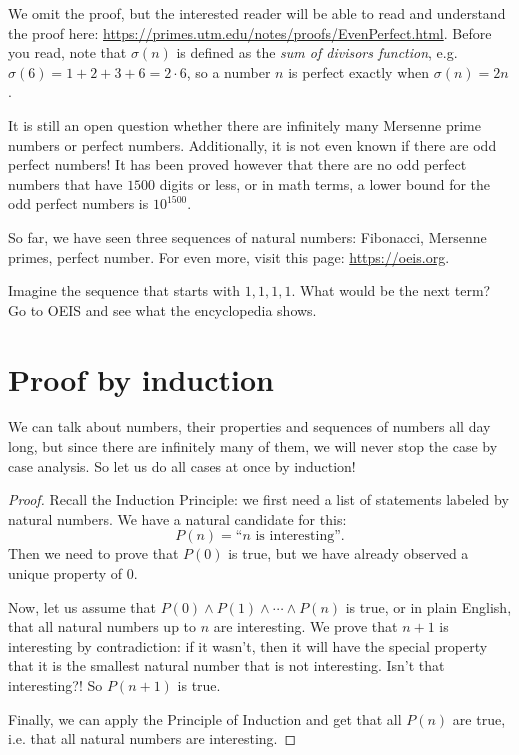 We omit the proof, but the interested reader will be able to read and understand the proof here: \url{https://primes.utm.edu/notes/proofs/EvenPerfect.html}. Before you read, note that $\sigma(n)$ is defined as the \emph{sum of divisors function}, e.g. $\sigma(6) = 1 + 2 + 3 + 6 = 2\cdot 6$, so a number $n$ is perfect exactly when $\sigma(n) = 2n$.

It is still an open question whether there are infinitely many Mersenne prime numbers or perfect numbers. Additionally, it is not even known if there are odd perfect numbers! It has been proved however that there are no odd perfect numbers that have $1500$ digits or less, or in math terms, a lower bound for the odd perfect numbers is $10^{1500}$.

So far, we have seen three sequences of natural numbers: Fibonacci, Mersenne primes, perfect number. For even more, visit this page: \url{https://oeis.org}.

\begin{exercise}
    Imagine the sequence that starts with $1,1,1,1$. What would be the next term? Go to OEIS and see what the encyclopedia shows.
\end{exercise}


\section{Proof by induction}

We can talk about numbers, their properties and sequences of numbers all day long, but since there are infinitely many of them, we will never stop the case by case analysis. So let us do all cases at once by induction!

\begin{proof}
Recall the Induction Principle: we first need a list of statements labeled by natural numbers. We have a natural candidate for this:
$$ P(n) = \mbox{``$n$ is interesting''}
.$$
Then we need to prove that $P(0)$ is true, but we have already observed a unique property of $0$. 

Now, let us assume that $P(0) \wedge P(1) \wedge \cdots \wedge P(n)$ is true, or in plain English, that all natural numbers up to $n$ are interesting. We prove that $n+1$ is interesting by contradiction: if it wasn't, then it will have the special property that it is the smallest natural number that is not interesting. Isn't that interesting?! So $P(n+1)$ is true.

Finally, we can apply the Principle of Induction and get that all $P(n)$ are true, i.e. that all natural numbers are interesting.
\end{proof}



